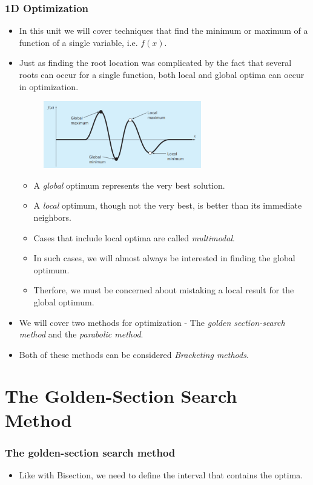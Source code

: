 \documentclass{if-beamer}
\begin{document}
\begin{frame}[t]
\frametitle{1D Optimization}
\begin{itemize}
	\item In this unit we will cover techniques that find the minimum or maximum of a function of a single variable, i.e. $f(x)$.
	\item Just as finding the root location was complicated by the fact that several roots can occur for a single function, both local
	and global optima can occur in optimization.
	\begin{figure}
		\centering
		\includegraphics[width = 0.65\textwidth]{figures/localglobal}
	\end{figure}
	\begin{itemize}
		\item A \textit{global} optimum represents the very best solution. 
		\item A \textit{local} optimum, though not the very best, is better than its immediate neighbors. 
		\item Cases that include local optima are called \textit{multimodal}. 
		\item In such cases, we will almost always be interested in finding the global optimum.
		\item Therfore, we must be concerned about mistaking a local result for the global optimum. 
	\end{itemize}
    \item We will cover two methods for optimization - The \textit{golden section-search method} and the \textit{parabolic method}.
    \item Both of these methods can be considered \textit{Bracketing methods}.
\end{itemize}
\end{frame}

\section{The Golden-Section Search Method}

\begin{frame}[t]
	\frametitle{The golden-section search method}
	\begin{itemize}
		\item Like with Bisection, we need to define the interval that contains the optima.
	\end{itemize}
\end{frame}
\end{document}
